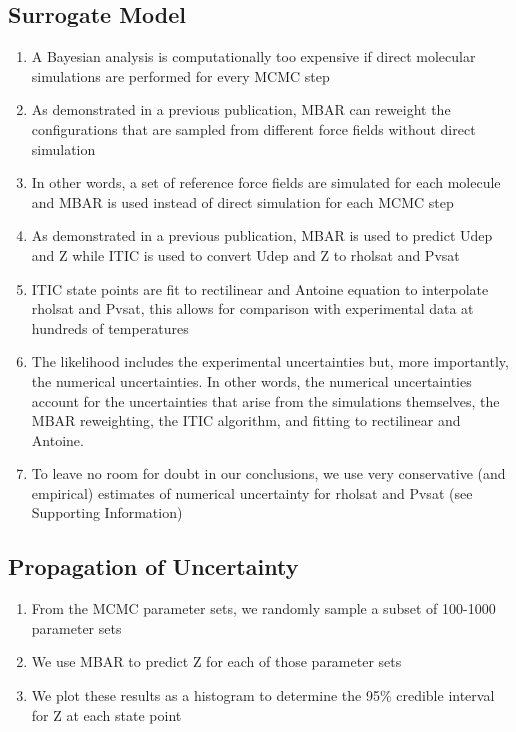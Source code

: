 \documentclass[preprint,letterpaper,floatfix,citeautoscript,aip,jcp]{revtex4-1}
\begin{document}
\subsection{Surrogate Model}

\begin{enumerate}
	\item A Bayesian analysis is computationally too expensive if direct molecular simulations are performed for every MCMC step
	\item As demonstrated in a previous publication, MBAR can reweight the configurations that are sampled from different force fields without direct simulation
	\item In other words, a set of reference force fields are simulated for each molecule and MBAR is used instead of direct simulation for each MCMC step
	\item As demonstrated in a previous publication, MBAR is used to predict Udep and Z while ITIC is used to convert Udep and Z to rholsat and Pvsat
	\item ITIC state points are fit to rectilinear and Antoine equation to interpolate rholsat and Pvsat, this allows for comparison with experimental data at hundreds of temperatures
	\item The likelihood includes the experimental uncertainties but, more importantly, the numerical uncertainties. In other words, the numerical uncertainties account for the uncertainties that arise from the simulations themselves, the MBAR reweighting, the ITIC algorithm, and fitting to rectilinear and Antoine.
	\item To leave no room for doubt in our conclusions, we use very conservative (and empirical) estimates of numerical uncertainty for rholsat and Pvsat (see Supporting Information)
\end{enumerate}

\subsection{Propagation of Uncertainty}

\begin{enumerate}
	\item From the MCMC parameter sets, we randomly sample a subset of 100-1000 parameter sets
	\item We use MBAR to predict Z for each of those parameter sets
	\item We plot these results as a histogram to determine the 95\% credible interval for Z at each state point
\end{enumerate}
\end{document}
